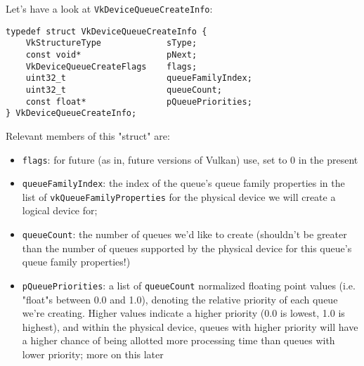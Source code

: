 \documentclass[12pt,letterpaper]{article}
\newcommand{\cil}[1]{\texttt{#1}}
\begin{document}
		Let's have a look at \cil{VkDeviceQueueCreateInfo}:
\begin{verbatim}
typedef struct VkDeviceQueueCreateInfo {
	VkStructureType             sType;
	const void*                 pNext;
	VkDeviceQueueCreateFlags    flags;
	uint32_t                    queueFamilyIndex;
	uint32_t                    queueCount;
	const float*                pQueuePriorities;
} VkDeviceQueueCreateInfo;
\end{verbatim}
		Relevant members of this "struct" are:
			\begin{itemize}
				\item \cil{flags}: for future (as in, future versions of Vulkan) use, set to 0 in the present
				
				\item \cil{queueFamilyIndex}: the index of the queue's queue family properties in the list of \cil{vkQueueFamilyProperties} for the physical device we will create a logical device for;
				
				\item \cil{queueCount}: the number of queues we'd like to create (shouldn't be greater than the number of queues supported by the physical device for this queue's queue family properties!)
				
				\item \cil{pQueuePriorities}: a list of \cil{queueCount} normalized floating point values (i.e. "float"s between 0.0 and 1.0), denoting the relative priority of each queue we're creating. Higher values indicate a higher priority (0.0 is lowest, 1.0 is highest), and within the physical device, queues with higher priority will have a higher chance of being allotted more processing time than queues with lower priority; more on this later
			\end{itemize}
		
\end{document}
